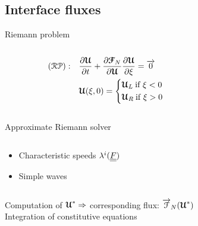 \subsection{Interface fluxes}
\begin{frame}
  \begin{block}{Riemann problem}
    \begin{columns}
      \begin{column}{0.5\textwidth}
        \begin{footnotesize}
          \begin{align*}
          (\mathcal{R}\mathcal{P}): \quad &\frac{\partial {\boldsymbol{\mathcal{U}}}}{\partial t} + \frac{\partial {\boldsymbol{\mathcal{F}}}_N}{\partial {\boldsymbol{\mathcal{U}}}} \frac{\partial {\boldsymbol{\mathcal{U}}}}{\partial \xi }= {\overrightarrow{0}} \\ 
                          & {\boldsymbol{\mathcal{U}}}(\xi,0) = \left\lbrace 
                            \begin{aligned}
                              & {\boldsymbol{\mathcal{U}}}_L \: \text{if } \xi < 0 \\
                              & {\boldsymbol{\mathcal{U}}}_R \: \text{if } \xi > 0 
                            \end{aligned} \right.
          \end{align*}
        \end{footnotesize}
      \end{column}
      \begin{column}{0.3\textwidth}
        
      \end{column}
    \end{columns}
  \end{block}
  \vspace{-0.4cm}
  \begin{footnotesize}
    \begin{block}{Approximate Riemann solver \cite{Toro}}
      \begin{columns}
        \begin{column}{0.4\textwidth}
          \begin{itemize}
          \item Characteristic speeds $\lambda^i({\underline{\underline{F}}})$
          \item Simple waves
          \end{itemize}
        \end{column}  
        \begin{column}{0.55\textwidth}
          
        \end{column}
      \end{columns}
    \end{block}
    Computation of ${\boldsymbol{\mathcal{U}}}^* \Rightarrow$ corresponding flux: ${\overrightarrow{\mathcal{F}}}_N({\boldsymbol{\mathcal{U}}}^*)$ \cite{Godunov_method}\\
    \alert{Integration of constitutive equations}
    
  \end{footnotesize}
  \vspace{-0.4cm}
 \end{frame}


